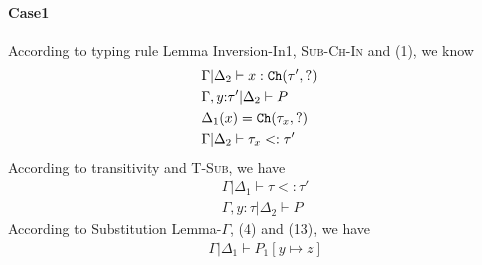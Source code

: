 \documentclass[master,english]{kuisthesis}
\theoremstyle{definition}
\begin{document}
\paragraph{Case1}
According to typing rule Lemma Inversion-In1, \textsc{Sub-Ch-In} and (1), we know
\begin{align}
    &\Gamma | \Delta_2 \vdash x : {\tt Ch}({\tau', ?})
    \\&\Gamma, y{:}\tau' | \Delta_2 \vdash P 
    \\&\Delta_1(x) = {\tt Ch}({\tau_x, ?})
     \\&\Gamma | \Delta_2 \vdash \tau_x <: \tau'
\end{align}\noindent
According to transitivity and \textsc{T-Sub}, we have
\begin{align}
    &\Gamma | \Delta_1 \vdash \tau <: \tau'
    \\&\Gamma, y{:}\tau | \Delta_2 \vdash P
\end{align}\noindent
According to Substitution Lemma-$\Gamma$, (4) and (13), we have
\begin{align}
    &\Gamma | \Delta_1 \vdash P_1[y \mapsto z]
\end{align}\noindent
\end{document}
